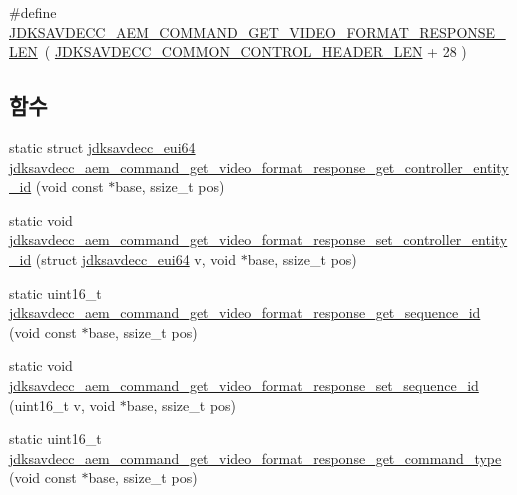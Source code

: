 \begin{DoxyCompactItemize}
\item 
\#define \hyperlink{group__command__get__video__format__response_ga3c3c55996e07f58797672156ffdd17cf}{J\+D\+K\+S\+A\+V\+D\+E\+C\+C\+\_\+\+A\+E\+M\+\_\+\+C\+O\+M\+M\+A\+N\+D\+\_\+\+G\+E\+T\+\_\+\+V\+I\+D\+E\+O\+\_\+\+F\+O\+R\+M\+A\+T\+\_\+\+R\+E\+S\+P\+O\+N\+S\+E\+\_\+\+L\+EN}~( \hyperlink{group__jdksavdecc__avtp__common__control__header_gaae84052886fb1bb42f3bc5f85b741dff}{J\+D\+K\+S\+A\+V\+D\+E\+C\+C\+\_\+\+C\+O\+M\+M\+O\+N\+\_\+\+C\+O\+N\+T\+R\+O\+L\+\_\+\+H\+E\+A\+D\+E\+R\+\_\+\+L\+EN} + 28 )
\end{DoxyCompactItemize}
\subsection*{함수}
\begin{DoxyCompactItemize}
\item 
static struct \hyperlink{structjdksavdecc__eui64}{jdksavdecc\+\_\+eui64} \hyperlink{group__command__get__video__format__response_ga8066ac78bd3abf00142de49d0a369e9e}{jdksavdecc\+\_\+aem\+\_\+command\+\_\+get\+\_\+video\+\_\+format\+\_\+response\+\_\+get\+\_\+controller\+\_\+entity\+\_\+id} (void const $\ast$base, ssize\+\_\+t pos)
\item 
static void \hyperlink{group__command__get__video__format__response_ga63d836a8751104e66d35a1736f9cd69e}{jdksavdecc\+\_\+aem\+\_\+command\+\_\+get\+\_\+video\+\_\+format\+\_\+response\+\_\+set\+\_\+controller\+\_\+entity\+\_\+id} (struct \hyperlink{structjdksavdecc__eui64}{jdksavdecc\+\_\+eui64} v, void $\ast$base, ssize\+\_\+t pos)
\item 
static uint16\+\_\+t \hyperlink{group__command__get__video__format__response_gae08c835c7b2bc04435b422992b828807}{jdksavdecc\+\_\+aem\+\_\+command\+\_\+get\+\_\+video\+\_\+format\+\_\+response\+\_\+get\+\_\+sequence\+\_\+id} (void const $\ast$base, ssize\+\_\+t pos)
\item 
static void \hyperlink{group__command__get__video__format__response_ga6d14a410f10cd3974d17dafefe889dad}{jdksavdecc\+\_\+aem\+\_\+command\+\_\+get\+\_\+video\+\_\+format\+\_\+response\+\_\+set\+\_\+sequence\+\_\+id} (uint16\+\_\+t v, void $\ast$base, ssize\+\_\+t pos)
\item 
static uint16\+\_\+t \hyperlink{group__command__get__video__format__response_ga3971ed1432fbbb935ce147377083c5e7}{jdksavdecc\+\_\+aem\+\_\+command\+\_\+get\+\_\+video\+\_\+format\+\_\+response\+\_\+get\+\_\+command\+\_\+type} (void const $\ast$base, ssize\+\_\+t pos)
\item 

\end{DoxyCompactItemize}
